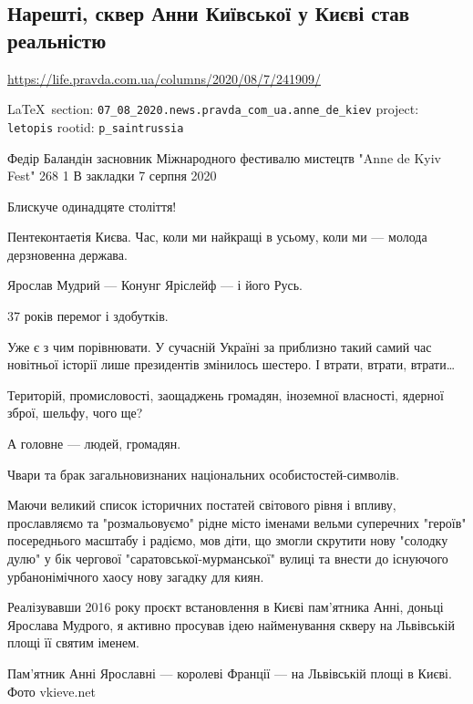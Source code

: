  
 
\subsection{Нарешті, сквер Анни Київської у Києві став реальністю}
\label{sec:07_08_2020.news.pravda_com_ua.anne_de_kiev}
\url{https://life.pravda.com.ua/columns/2020/08/7/241909/}
  
\vspace{0.5cm}
 {\ifDEBUG\small\LaTeX~section: \verb|07_08_2020.news.pravda_com_ua.anne_de_kiev| project: \verb|letopis| rootid: \verb|p_saintrussia| \fi}
\vspace{0.5cm}

Федір Баландін засновник Міжнародного фестивалю мистецтв "Anne de Kyiv Fest"
268 1 В закладки 7 серпня 2020

Блискуче одинадцяте століття!

Пентеконтаетія Києва. Час, коли ми найкращі в усьому, коли ми --- молода
дерзновенна держава.

Ярослав Мудрий --- Конунг Яріслейф --- і його Русь.

37 років перемог і здобутків.

Уже є з чим порівнювати. У сучасній Україні за приблизно такий самий час
новітньої історії лише президентів змінилось шестеро. І втрати, втрати, втрати…

Територій, промисловості, заощаджень громадян, іноземної власності, ядерної
зброї, шельфу, чого ще?

А головне --- людей, громадян.

Чвари та брак загальновизнаних національних особистостей-символів.

Маючи великий список історичних постатей світового рівня і впливу, прославляємо
та "розмальовуємо" рідне місто іменами вельми суперечних "героїв" посереднього
масштабу і радіємо, мов діти, що змогли скрутити нову "солодку дулю" у бік
чергової "саратовської-мурманської" вулиці та внести до існуючого
урбанонімічного хаосу нову загадку для киян.

Реалізувавши 2016 року проєкт встановлення в Києві пам’ятника Анні, доньці
Ярослава Мудрого, я активно просував ідею найменування скверу на Львівській
площі її святим іменем.

Пам'ятник Анні Ярославні --- королеві Франції --- на Львівській площі в Києві.  Фото
vkieve.net

